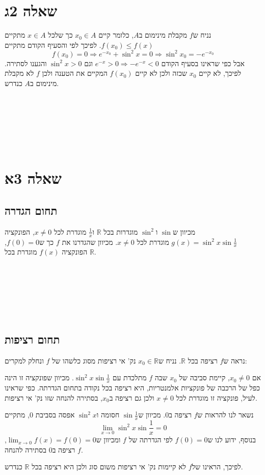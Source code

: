 \documentclass[11pt, oneside]{article}
\newcommand{\qed}{\R{$\blacksquare$}}
\newcommand{\br}{\\\\\\\\\\\\\\}
\newcommand{\logr}{\Longrightarrow}
\newcommand{\mR}{\mathbb{R}}
\newcommand{\ta}[3]{\R{טענה #3#2.#1}}
\begin{document}
\section*{שאלה 2ג}
נניח ש$f$ מקבלת מינימום ב$A$, כלומר קיים $x_{0} \in A$ כך שלכל $x \in A$ מתקיים $f(x_{0}) \le f(x)$. לפיכך לפי \ta{3}{31}{} והסעיף הקודם מתקיים
\[
f(x_{0}) = 0 \logr e^{-x_{0}} + \sin^{2}{x} = 0 \logr \sin^{2}{x_{0}} = -e^{-x_{0}}
\]
אבל כפי שראינו בסעיף הקודם $e^{-x} > 0 \logr -e^{-x} < 0$ וגם $\sin^{2}{x} > 0$ והגענו לסתירה. לפיכך, לא קיים $x_{0}$ שכזה ולכן לא קיים $f(x_{0})$ המקיים את הטענה ולכן $f$ לא מקבלת מינימום ב$A$ כנדרש.
\br\qed
\clearpage

\section*{שאלה 3א}
\subsection*{תחום הגדרה}
מכיוון ש$\sin$ ו$\sin^{2}$ מוגדרות בכל $\mR$ ו$\frac{1}{x}$ מוגדרת לכל $x \neq 0$, הפונקציה $g(x) = \sin^{2}x\sin\frac{1}{x}$ מוגדרת לכל $x \neq 0$. מכיוון שהגדרנו את $f$ כך ש$f(0) = 0$, הפונקציה $f(x)$ מוגדרת בכל $\mR$.
\br\qed

\subsection*{תחום רציפות}
נראה ש$f$ רציפה בכל $\mR$. נניח ש$x_{0} \in \mR$ נק' אי רציפות מסוג כלשהו של $f$ ונחלק למקרים:

אם $x_{0} \neq 0$, קיימת סביבה של $x_{0}$ שבה $f$ מתלכדת עם $\sin^{2}x\sin\frac{1}{x}$. מכיוון שפונקציה זו הינה כפל של הרכבה של פונקציות אלמנטריות, היא רציפה בכל נקודה בתחום הגדרתה. כפי שראינו לעיל, פונקציה זו מוגדרת לכל $x \neq 0$ ולכן גם רציפה ב$x_{0}$, בסתירה להנחה שזו נק' אי רציפות.

נשאר לנו להראות ש$f$ רציפה ב0. מכיוון ש$\sin\frac{1}{x}$ חסומה ו$\sin^{2}x$ אפסה בסביבת 0, מתקיים
\[
\lim_{x \to 0} \sin^{2}x\sin\frac{1}{x} = 0
\]
בנוסף, ידוע לנו ש$f(0) = 0$ לפי הגדרתה של $f$ ומכיוון ש$\lim_{x \to 0} f(x) = f(0) = 0$, $f$ רציפה ב0 בסתירה להנחה.

לפיכך, הראינו של$f$ לא קיימות נק' אי רציפות משום סוג ולכן היא רציפה בכל $\mR$ כנדרש.
\br\qed
\end{document}
